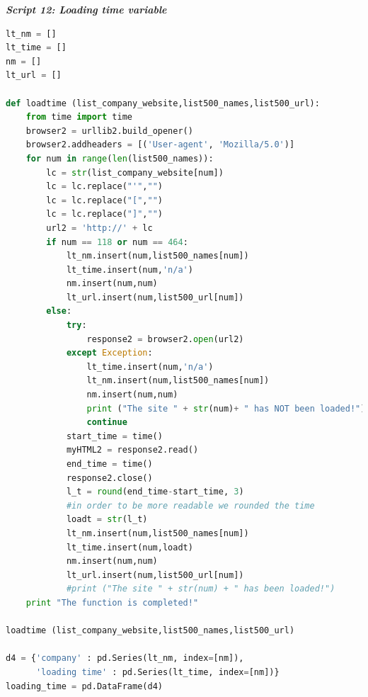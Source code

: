\documentclass{article}
\begin{document}
\begin{center}
\textit{\textbf{Script 12: Loading time variable}}\label{p12}
\end{center}
\begin{lstlisting}[language=Python]
lt_nm = [] 
lt_time = []
nm = []
lt_url = []

def loadtime (list_company_website,list500_names,list500_url):
    from time import time
    browser2 = urllib2.build_opener()
    browser2.addheaders = [('User-agent', 'Mozilla/5.0')]
    for num in range(len(list500_names)):
        lc = str(list_company_website[num])        
        lc = lc.replace("'","")   
        lc = lc.replace("[","")
        lc = lc.replace("]","")
        url2 = 'http://' + lc
        if num == 118 or num == 464:            
            lt_nm.insert(num,list500_names[num])            
            lt_time.insert(num,'n/a')
            nm.insert(num,num)
            lt_url.insert(num,list500_url[num])           
        else:
            try:
                response2 = browser2.open(url2)
            except Exception:
                lt_time.insert(num,'n/a')
                lt_nm.insert(num,list500_names[num])  
                nm.insert(num,num)
                print ("The site " + str(num)+ " has NOT been loaded!")
                continue     
            start_time = time()
            myHTML2 = response2.read()
            end_time = time()
            response2.close()
            l_t = round(end_time-start_time, 3) 
            #in order to be more readable we rounded the time
            loadt = str(l_t)
            lt_nm.insert(num,list500_names[num])            
            lt_time.insert(num,loadt)
            nm.insert(num,num)
            lt_url.insert(num,list500_url[num])
            #print ("The site " + str(num) + " has been loaded!")
    print "The function is completed!"

loadtime (list_company_website,list500_names,list500_url)

d4 = {'company' : pd.Series(lt_nm, index=[nm]),
      'loading time' : pd.Series(lt_time, index=[nm])}
loading_time = pd.DataFrame(d4)    
\end{lstlisting}
\end{document}
